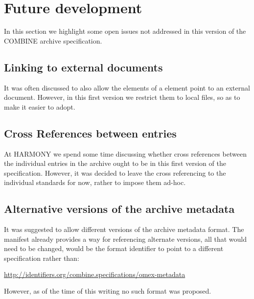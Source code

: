 
\section{Future development}
\label{future}
In this section we highlight some open issues not addressed in this 
version of the COMBINE archive specification. 


\subsection{Linking to external documents}
It was often discussed to also allow the  elements of a 
\Content element point to an external document. However, in this first 
version we restrict them to local files, so as to make it easier to 
adopt. 

\subsection{Cross References between entries}
At HARMONY we spend some time discussing whether cross references 
between the individual entries in the archive ought to be in this first 
version of the specification. However, it was decided to leave the cross 
referencing to the individual standards for now, rather to impose them 
ad-hoc. 

\subsection{Alternative versions of the archive metadata}
It was suggested to allow different versions of the archive metadata 
format. The manifest already provides a way for referencing alternate 
versions, all that would need to be changed, would be the format 
identifier to point to a different specification rather than: 


\url{http://identifiers.org/combine.specifications/omex-metadata}

However, as of the time of this writing no such format was proposed.